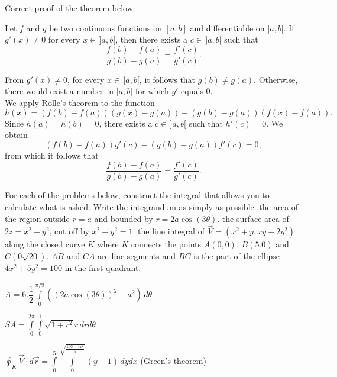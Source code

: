 \begin{Answer}\phantom{}
Correct proof of the theorem below.
\begin{theorem}
    Let $f$ and $g$ be two continuous functions on $[a,b]$ and differentiable on $]a,b[$. If $g'(x) \neq 0$ for every $x \in\, ]a,b[$, then there exists a $c \in \, ]a,b[$ such that 
	\[ \dfrac{f(b)-f(a)}{g(b)-g(a)} = \dfrac{f'(c)}{g'(c)}. \]
\end{theorem} 
    
From $g'(x) \neq 0$, for every $x \in\, ]a,b[$, it follows that $g(b) \neq g(a)$. Otherwise, there would exist a number in $]a,b[$ for which $g'$ equals 0. \\
We apply Rolle's theorem to the function
\[h(x) = \left( f(b)-f(a) \right) \left(g(x)-g(a) \right) - \left( g(b)-g(a) \right) \left(f(x)-f(a) \right).  \]
Since $h(a)=h(b)=0$, there exists a $c\in\, ]a,b[$ such that $h'(c)=0$. We obtain 
\[ \left( f(b)-f(a) \right) g'(c) - \left( g(b)-g(a) \right) f'(c)=0,\]
from which it follows that
\[ \dfrac{f(b)-f(a)}{g(b)-g(a)} = \dfrac{f'(c)}{g'(c)}. \]
\end{Answer}


\begin{Exercise} %
For each of the problems below, construct the integral that allows you to calculate what is asked. Write the integrandum as simply as possible.
\Question %
the area of the region outside $r=a$ and bounded by $r=2a\cos(3\theta)$. %
\Question %
the surface area of $2z=x^2+y^2$, cut off by $x^2+y^2=1$. %
\Question %
the line integral of $\vec{V}=\left(x^2+y,xy+2y^2\right)$ along the closed curve $K$ where $K$ connects the points $A(0,0)$, $B(5.0)$ and $C(0 \sqrt{20})$. $AB$ and $CA$ are line segments and $BC$ is the part of the ellipse $4x^2+5y^2=100$ in the first quadrant. %
\EndCurrentQuestion
\end{Exercise}

\begin{Answer}

\Question $A = 6 . \dfrac{1}{2} \displaystyle \int \limits_0^{\pi/9} \left( \left( 2a \cos(3\theta) \right)^2 - a^2 \right) \, d \theta $ 

\Question $SA = \displaystyle \int \limits_0^{2\pi} \int \limits_0^{1} \sqrt{1+r^2} r\, dr d \theta $ 

\Question $\displaystyle \oint_K  \vec{V} \cdot d\vec{r} = \displaystyle \int \limits_0^{5} \int \limits_0^{\sqrt{\frac{100 - 4x^2}{5}}} (y-1)\, dy d x $ \quad (Green's theorem)
   

\end{Answer}



